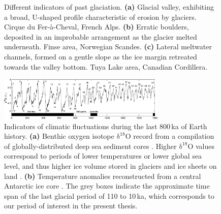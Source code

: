\documentclass{article}
\newcommand{\chem}[1]{\ensuremath{\mathrm{#1}}}
\newcommand{\subgraphics}[3][,]{%
  \setbox1=\hbox{\texttt{[image: \#3]}}%
  \leavevmode\rlap{\usebox1}%
  \rlap{\hspace*{0.25em}
        \raisebox{\dimexpr\ht1-3ex}{\textbf{(#2)}}}%
  \phantom{\usebox1}%
}
\begin{document}

\begin{figure}
  \centering
  \makebox[0pt]{
    \subgraphics{a}{photo-glacial-valley}
    \hspace{1cm}
    \subgraphics{b}{photo-erratic-boulder}
    \hspace{1cm}
    \subgraphics{c}{photo-melt-channels}
  }
  \caption{Different indicators of past glaciation.
           \textbf{(a)} Glacial valley, exhibiting a broad, U-shaped profile
           characteristic of erosion by glaciers.
           Cirque du Fer-\`{a}-Cheval, French Alps.
           \textbf{(b)} Erratic boulders, deposited in an improbable
           arrangement as the glacier melted underneath.
           Finse area, Norwegian Scandes.
           \textbf{(c)} Lateral meltwater channels, formed on a gentle slope
           as the ice margin retreated towards the valley bottom. Tuya Lake
           area, Canadian Cordillera.}
  \label{fig:glaciation-indicators}
\end{figure}

\begin{figure}
  \centering
  \includegraphics[width=80mm]{paleo-timeseries}
  \caption{Indicators of climatic fluctuations during the last 800\,ka of
           Earth history.
           \textbf{(a)} Benthic oxygen isotope \chem{\delta^{18}O} record from
           a compilation of globally-distributed deep sea sediment cores
           \citep{Lisiecki.Raymo.2005}. Higher \chem{\delta^{18}O} values
           correspond to periods of lower temperatures \citep{Emiliani.1955}
           or lower global sea level, and thus higher ice volume stored in
           glaciers and ice sheets on land \citep{Shackleton.1967}.
           \textbf{(b)} Temperature anomalies reconstructed from a central
           Antarctic ice core \citep[EPICA,][]{Jouzel.etal.2007}.
           The grey boxes indicate the approximate time span of the last
           glacial period of 110 to 10\,ka, which corresponds to our period of
           interest in the present thesis.}
  \label{fig:paleo-timeseries}
\end{figure}
\end{document}
